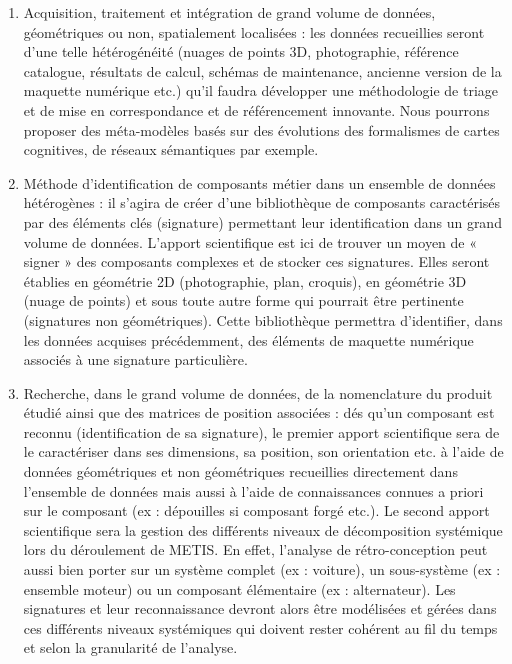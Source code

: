 \begin{enumerate}
  \item Acquisition, traitement et intégration de grand volume de données, géométriques ou non, spatialement localisées : les données recueillies seront d’une telle hétérogénéité (nuages de points 3D, photographie, référence catalogue, résultats de calcul, schémas de maintenance, ancienne version de la maquette numérique etc.) qu’il faudra développer une méthodologie de triage et de mise en correspondance et de référencement innovante. Nous pourrons proposer des méta-modèles basés sur des évolutions des formalismes de cartes cognitives, de réseaux sémantiques par exemple. \\
  
  \item Méthode d’identification de composants métier dans un ensemble de données hétérogènes : il s’agira de créer d’une bibliothèque de composants caractérisés par des éléments clés (signature) permettant leur identification dans un grand volume de données. L’apport scientifique est  ici de trouver un moyen de « signer » des composants complexes et de stocker ces signatures. Elles seront établies en géométrie 2D (photographie, plan, croquis), en géométrie 3D (nuage de points) et sous toute autre forme qui pourrait être pertinente (signatures non géométriques). Cette bibliothèque permettra d’identifier, dans les données acquises précédemment, des éléments de maquette numérique associés à une signature particulière.\\
  
\clearpage

  \item Recherche, dans le grand volume de données, de la nomenclature du produit étudié ainsi que des matrices de position associées : dés qu’un composant est reconnu (identification de sa signature), le premier apport scientifique sera de le caractériser dans ses dimensions, sa position, son orientation etc. à l’aide de données géométriques et non géométriques recueillies directement dans l’ensemble de données mais aussi à l’aide de connaissances connues a priori sur le composant (ex : dépouilles si composant forgé etc.). Le second apport scientifique sera la gestion des différents niveaux de décomposition systémique lors du déroulement de METIS. En effet, l’analyse de rétro-conception peut aussi bien porter sur un système complet (ex : voiture), un sous-système (ex : ensemble moteur) ou un composant élémentaire (ex : alternateur). Les signatures et leur reconnaissance devront alors être modélisées et gérées dans ces différents niveaux systémiques qui doivent rester cohérent au fil du temps et selon la granularité de l’analyse.\\
  

\end{enumerate}
